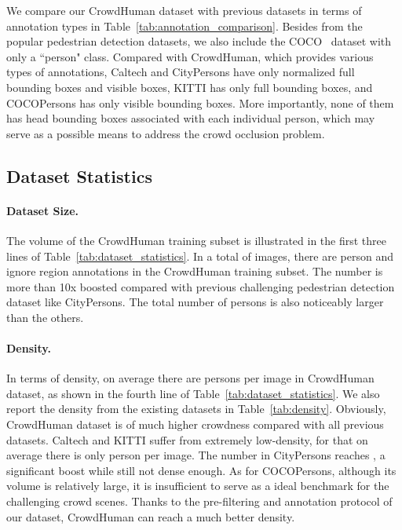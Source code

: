 \documentclass[10pt,twocolumn,letterpaper]{article}
\begin{document}
We compare our CrowdHuman dataset with previous datasets in terms of annotation types in Table~\ref{tab:annotation_comparison}. Besides from the popular pedestrian detection datasets, we also include the COCO~\cite{lin2014microsoft} dataset with only a ``person" class. Compared with CrowdHuman, which provides various types of annotations, Caltech and CityPersons have only normalized full bounding boxes and visible boxes, KITTI has only full bounding boxes, and COCOPersons has only visible bounding boxes. More importantly, none of them has head bounding boxes associated with each individual person, which may serve as a possible means to address the crowd occlusion problem.
 


\subsection{Dataset Statistics}
\label{sec:dataset_statistics}
\paragraph{Dataset Size.}
The volume of the CrowdHuman training subset is illustrated in the first three lines of Table~\ref{tab:dataset_statistics}. In a total of  images, there are  person and  ignore region annotations in the CrowdHuman training subset. The number is more than 10x boosted compared with previous challenging pedestrian detection dataset like CityPersons. The total number of persons is also noticeably larger than the others. 

\paragraph{Density.}
In terms of density, on average there are  persons per image in CrowdHuman dataset, as shown in the fourth line of Table~\ref{tab:dataset_statistics}. We also report the density from the existing datasets in Table~\ref{tab:density}. Obviously, CrowdHuman dataset is of much higher crowdness compared with all previous datasets. Caltech and KITTI suffer from extremely low-density, for that on average there is only  person per image. The number in CityPersons reaches , a significant boost while still not dense enough. As for COCOPersons, although its volume is relatively large, it is insufficient to serve as a ideal benchmark for the challenging crowd scenes. Thanks to the pre-filtering and annotation protocol of our dataset, CrowdHuman can reach a much better density.
\end{document}
